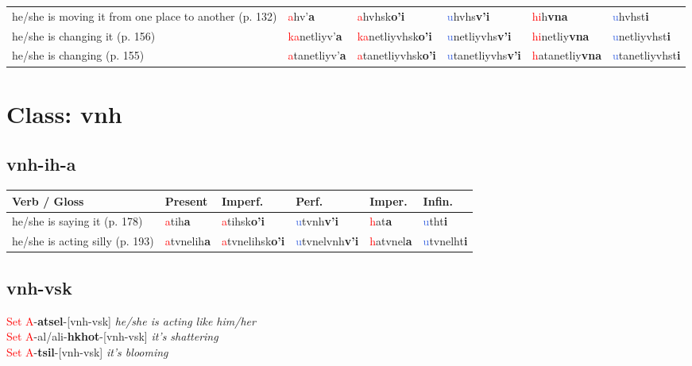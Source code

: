 \documentclass[oneside,openany]{book}%
\begin{document}
\begin{tabularx}{\textwidth}{>{\hsize=1.5\hsize\RaggedRight}X >{\hsize=0.9\hsize}X >{\hsize=0.9\hsize}X >{\hsize=0.9\hsize}X >{\hsize=0.9\hsize}X >{\hsize=0.9\hsize}X}
he/she is moving it from one place to another (p. 132)&\textcolor{Red}{a}hv'\textbf{a}&\textcolor{Red}{a}hvhsk\textbf{o'i}&\textcolor{RoyalBlue}{u}hvhs\textbf{v'i}&\textcolor{Red}{hi}h\textbf{vna}&\textcolor{RoyalBlue}{u}hvhst\textbf{i}\\%
he/she is changing it (p. 156)&\textcolor{Red}{ka}netliyv'\textbf{a}&\textcolor{Red}{ka}netliyvhsk\textbf{o'i}&\textcolor{RoyalBlue}{u}netliyvhs\textbf{v'i}&\textcolor{Red}{hi}netliy\textbf{vna}&\textcolor{RoyalBlue}{u}netliyvhst\textbf{i}\\%
he/she is changing (p. 155)&\textcolor{Red}{a}tanetliyv'\textbf{a}&\textcolor{Red}{a}tanetliyvhsk\textbf{o'i}&\textcolor{RoyalBlue}{u}tanetliyvhs\textbf{v'i}&\textcolor{Red}{h}atanetliy\textbf{vna}&\textcolor{RoyalBlue}{u}tanetliyvhst\textbf{i}\\%
\bottomrule%
\end{tabularx}%
\vspace{1em}%
\needspace{3in}%
\section*{Class: vnh}%
%
\needspace{1in}%
\subsection*{vnh-ih-a}%
\begin{tabularx}{\textwidth}{>{\hsize=1.5\hsize\RaggedRight}X >{\hsize=0.9\hsize}X >{\hsize=0.9\hsize}X >{\hsize=0.9\hsize}X >{\hsize=0.9\hsize}X >{\hsize=0.9\hsize}X}%
\toprule%
\textbf{Verb / Gloss}&\textbf{Present}&\textbf{Imperf.}&\textbf{Perf.}&\textbf{Imper.}&\textbf{Infin.}\\%
\midrule%
he/she is saying it (p. 178)&\textcolor{Red}{a}tih\textbf{a}&\textcolor{Red}{a}tihsk\textbf{o'i}&\textcolor{RoyalBlue}{u}tvnh\textbf{v'i}&\textcolor{Red}{h}at\textbf{a}&\textcolor{RoyalBlue}{u}tht\textbf{i}\\%
he/she is acting silly (p. 193)&\textcolor{Red}{a}tvnelih\textbf{a}&\textcolor{Red}{a}tvnelihsk\textbf{o'i}&\textcolor{RoyalBlue}{u}tvnelvnh\textbf{v'i}&\textcolor{Red}{h}atvnel\textbf{a}&\textcolor{RoyalBlue}{u}tvnelht\textbf{i}\\%
\bottomrule%
\end{tabularx}%
\vspace{1em}%
\needspace{1in}%
\subsection*{vnh-vsk}%
\textcolor{Red}{Set A}{-}\textbf{atsel}{-}[vnh-vsk] \textit{ he/she is acting like him/her} \\%
\textcolor{Red}{Set A}{-}al/ali{-}\textbf{hkhot}{-}[vnh-vsk] \textit{ it's shattering} \\%
\textcolor{Red}{Set A}{-}\textbf{tsil}{-}[vnh-vsk] \textit{ it's blooming} \\%
\vspace{1em}%
\needspace{1in}%
\end{document}
